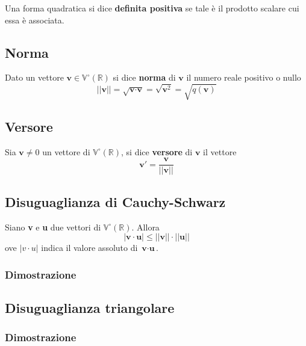 \documentclass[../main.tex]{subfiles}
\begin{document}
Una forma quadratica si dice \textbf{definita positiva} se tale è il prodotto
scalare cui essa è associata.

\subsection{Norma}
Dato un vettore $\textbf{v}\in\mathbb{V}^{\circ}(\mathbb{R})$ si dice
\textbf{norma} di $\textbf{v}$ il numero reale positivo o nullo
\[
    ||\textbf{v}|| = \sqrt{\textbf{v}\cdot\textbf{v}} = \sqrt{\textbf{v}^2} = \sqrt{q(\textbf{v})}
\]

\subsection{Versore}
Sia $\textbf{v}\ne0$ un vettore di $\mathbb{V}^{\circ} (\mathbb{R})$, si dice
\textbf{versore} di $\textbf{v}$ il vettore
\[
    \textbf{v}' = \dfrac{\textbf{v}}{||\textbf{v}||}
\]

\subsection{Disuguaglianza di Cauchy-Schwarz}
Siano \textbf{v} e \textbf{u} due vettori di $\mathbb{V}^{\circ} (\mathbb{R})$.
Allora
\[
    |\textbf{v}\cdot\textbf{u}|\leq||\textbf{v}||\cdot||\textbf{u}||
\]
ove $|v\cdot u|$ indica il valore assoluto di $\textbf{v}\cdot\textbf{u}$.

\subsubsection{Dimostrazione}

\subsection{Disuguaglianza triangolare}

\subsubsection{Dimostrazione}
\end{document}
